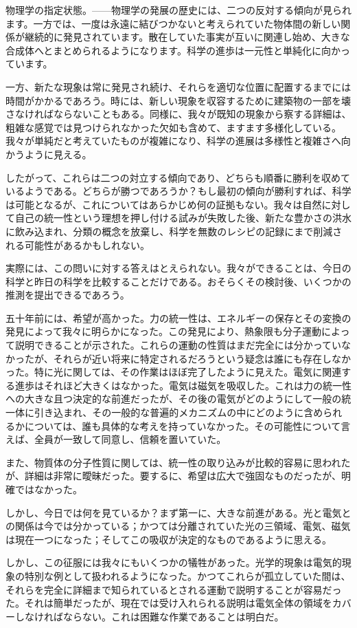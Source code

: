 \documentclass[a4paper,11pt,openany]{ltjsbook}
\begin{document}
物理学の指定状態。——物理学の発展の歴史には、二つの反対する傾向が見られます。一方では、一度は永遠に結びつかないと考えられていた物体間の新しい関係が継続的に発見されています。散在していた事実が互いに関連し始め、大きな合成体へとまとめられるようになります。科学の進歩は一元性と単純化に向かっています。

一方、新たな現象は常に発見され続け、それらを適切な位置に配置するまでには時間がかかるであろう。時には、新しい現象を収容するために建築物の一部を壊さなければならないこともある。同様に、我々が既知の現象から察する詳細は、粗雑な感覚では見つけられなかった欠如も含めて、ますます多様化している。我々が単純だと考えていたものが複雑になり、科学の進展は多様性と複雑さへ向かうように見える。

したがって、これらは二つの対立する傾向であり、どちらも順番に勝利を収めているようである。どちらが勝つであろうか？もし最初の傾向が勝利すれば、科学は可能となるが、これについてはあらかじめ何の証拠もない。我々は自然に対して自己の統一性という理想を押し付ける試みが失敗した後、新たな豊かさの洪水に飲み込まれ、分類の概念を放棄し、科学を無数のレシピの記録にまで削減される可能性があるかもしれない。

実際には、この問いに対する答えはとえられない。我々ができることは、今日の科学と昨日の科学を比較することだけである。おそらくその検討後、いくつかの推測を提出できるであろう。

五十年前には、希望が高かった。力の統一性は、エネルギーの保存とその変換の発見によって我々に明らかになった。この発見により、熱象限も分子運動によって説明できることが示された。これらの運動の性質はまだ完全には分かっていなかったが、それらが近い将来に特定されるだろうという疑念は誰にも存在しなかった。特に光に関しては、その作業はほぼ完了したように見えた。電気に関連する進歩はそれほど大きくはなかった。電気は磁気を吸収した。これは力の統一性への大きな且つ決定的な前進だったが、その後の電気がどのようにして一般の統一体に引き込まれ、その一般的な普遍的メカニズムの中にどのように含められるかについては、誰も具体的な考えを持っていなかった。その可能性について言えば、全員が一致して同意し、信頼を置いていた。

また、物質体の分子性質に関しては、統一性の取り込みが比較的容易に思われたが、詳細は非常に曖昧だった。要するに、希望は広大で強固なものだったが、明確ではなかった。

しかし、今日では何を見ているか？まず第一に、大きな前進がある。光と電気との関係は今では分かっている；かつては分離されていた光の三領域、電気、磁気は現在一つになった；そしてこの吸収が決定的なものであるように思える。

しかし、この征服には我々にもいくつかの犠牲があった。光学的現象は電気的現象の特別な例として扱われるようになった。かつてこれらが孤立していた間は、それらを完全に詳細まで知られているとされる運動で説明することが容易だった。それは簡単だったが、現在では受け入れられる説明は電気全体の領域をカバーしなければならない。これは困難な作業であることは明白だ。
\end{document}

